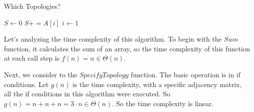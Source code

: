 \documentclass[a4paper]{article}
\begin{document}
\begin{algorithm}
\renewcommand{\thealgorithm}{}
\caption{Which Topologies?}
\begin{algorithmic}[1]
    \State $S \gets 0$
        \State $S += A[i]$
    \EndFor
    \State {}
\EndProcedure
\State
{} 
    \State $i \gets 1$
         
            \State {}
        \EndIf
        
            \State {}
        \Else
            \State {}
        \EndIf
\EndProcedure
\end{algorithmic}
\end{algorithm}
Let's analyzing the time complexity of this algorithm. To begin with the $Sum$ function, it calculates the sum of an array, so the time complexity of this function at each call step is $f(n) = n \in \Theta(n)$. \par
Next, we consider to the $SpecifyTopology$ function. The basic operation is in if conditions. Let $g(n)$ is the time complexity, with a specific adjacency matrix, all the if conditions in this algorithm were executed. So $g(n) = n + n + n = 3 \cdot n \in \Theta(n)$. So the time complexity is linear.
\newpage
\end{document}
